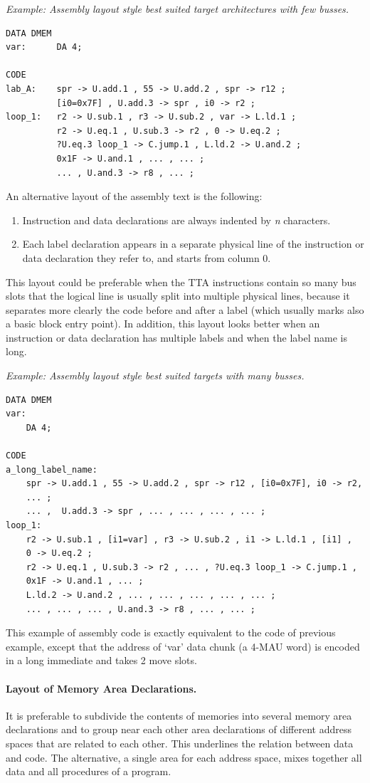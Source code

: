 \documentclass[twoside]{tceusermanual}
\begin{document}
\emph{Example: Assembly layout style best suited target architectures with
few busses.}
\begin{verbatim}
DATA DMEM
var:      DA 4;

CODE
lab_A:    spr -> U.add.1 , 55 -> U.add.2 , spr -> r12 ;
          [i0=0x7F] , U.add.3 -> spr , i0 -> r2 ;
loop_1:   r2 -> U.sub.1 , r3 -> U.sub.2 , var -> L.ld.1 ;
          r2 -> U.eq.1 , U.sub.3 -> r2 , 0 -> U.eq.2 ;
          ?U.eq.3 loop_1 -> C.jump.1 , L.ld.2 -> U.and.2 ;
          0x1F -> U.and.1 , ... , ... ;
          ... , U.and.3 -> r8 , ... ;
\end{verbatim}

An alternative layout of the assembly text is the following:
\begin{enumerate}
\item %
  Instruction and data declarations are always indented by \emph{n}
  characters.
\item %
  Each label declaration appears in a separate physical line of the
  instruction or data declaration they refer to, and starts from column 0.
\end{enumerate}
This layout could be preferable when the TTA instructions contain so many
bus slots that the logical line is usually split into multiple physical
lines,
because it separates more clearly the code before and after a label (which
usually marks also a basic block entry point).  In addition, this layout
looks better when an instruction or data declaration has multiple labels and
when the label name is long.

\emph{Example: Assembly layout style best suited targets with many busses.}
\begin{verbatim}
DATA DMEM
var:
    DA 4;

CODE
a_long_label_name:
    spr -> U.add.1 , 55 -> U.add.2 , spr -> r12 , [i0=0x7F], i0 -> r2,
    ... ;
    ... ,  U.add.3 -> spr , ... , ... , ... , ... ;
loop_1:
    r2 -> U.sub.1 , [i1=var] , r3 -> U.sub.2 , i1 -> L.ld.1 , [i1] ,
    0 -> U.eq.2 ;
    r2 -> U.eq.1 , U.sub.3 -> r2 , ... , ?U.eq.3 loop_1 -> C.jump.1 ,
    0x1F -> U.and.1 , ... ;
    L.ld.2 -> U.and.2 , ... , ... , ... , ... , ... ;
    ... , ... , ... , U.and.3 -> r8 , ... , ... ;
\end{verbatim}
This example of assembly code is exactly equivalent to the code of previous
example, except that the address of `var' data chunk (a 4-MAU word) is
encoded in a long immediate and takes 2 move slots.

\paragraph{Layout of Memory Area Declarations.}
It is preferable to subdivide the contents of memories into several memory
area declarations and to group near each other area declarations of
different address spaces that are related to each other.  This underlines
the relation between data and code.
%
The alternative, a single area for each address space, mixes together all
data and all procedures of a program.
\end{document}
